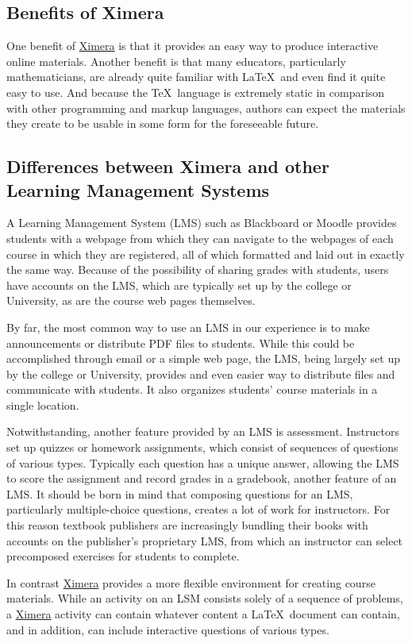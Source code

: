 \documentclass{ximera}
\begin{document}
\subsection{Benefits of Ximera}
One benefit of \href{http://ximera.osu.edu}{\sf Ximera}
is that it provides an easy way to produce interactive online materials.
Another benefit is that many educators, particularly mathematicians,
are already quite familiar with \LaTeX\ and
even find it quite easy to use.
And because the \TeX\ language is extremely static in comparison with
other programming and markup languages, authors can expect
the materials they create to be usable in some
form for the foreseeable future.

\subsection{Differences between Ximera and other
Learning Management Systems}
A Learning Management System
(LMS) such as Blackboard or Moodle
provides students with a webpage from
which they can navigate to the webpages of
each course in which they are registered, all of
which formatted and laid out in exactly the same way.
Because of the possibility of sharing grades
with students, users have accounts on the LMS,
which are typically set up by
the college or University, as are the course
web pages themselves.

By far, the most common way to use an LMS in our
experience is to make announcements or distribute PDF files to students.
While this could be accomplished through email
or a simple web page, the LMS, being
largely set up by the college or University, provides
and even easier way to distribute files and communicate with students.
It also organizes students' course materials in a single location.

Notwithstanding, another feature provided by an LMS is assessment.
Instructors set up quizzes or homework assignments,
which consist of sequences of questions of various types.
Typically each question has a unique answer, allowing
the LMS to score the assignment and record grades in a
gradebook, another feature of an LMS.
It should be born in mind that composing questions for
an LMS, particularly multiple-choice questions, creates a lot of work
for instructors. For this reason textbook publishers
are increasingly bundling their books with accounts
on the publisher's proprietary LMS, from which an
instructor can select precomposed exercises for students
to complete.

In contrast \href{http://ximera.osu.edu}{\sf Ximera}
provides a more flexible environment for creating course materials.
While an activity on an LSM consists solely of a sequence
of problems, a \href{http://ximera.osu.edu}{\sf Ximera}
activity can contain whatever content a \LaTeX\ document
can contain, and in addition, can include interactive questions
of various types.
\end{document}
